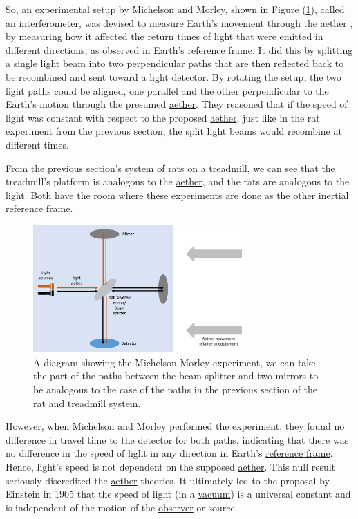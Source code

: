 So, an experimental setup by Michelson and Morley, shown in Figure (\ref{fig: Michelson_morley}), called an interferometer, was devised to measure Earth's movement through the \hyperlink{def-aether}{aether} \cite{EtherExperiment}, by measuring how it affected the return times of light that were emitted in different directions, as observed in Earth's \hyperlink{def-Reference-frame}{reference frame}.
It did this by splitting a single light beam into two perpendicular paths that are then reflected back to be recombined and sent toward a light detector.
By rotating the setup, the two light paths could be aligned, one parallel and the other perpendicular to the Earth's motion through the presumed \hyperlink{def-aether}{aether}.
They reasoned that if the speed of light was constant with respect to the proposed \hyperlink{def-aether}{aether}, just like in the rat experiment from the previous section, the split light beams would recombine at different times.

From the previous section's system of rats on a treadmill, we can see that the treadmill's platform is analogous to the \hyperlink{def-aether}{aether}, and the rats are analogous to the light.
Both have the room where these experiments are done as the other inertial reference frame.

\begin{figure}[H]
	\centering
	\includegraphics[width=8cm]{images/pdf/Michelson_morley.pdf}
	\caption{A diagram showing the Michelson-Morley experiment, we can take the part of the paths between the beam splitter and two mirrors to be analogous to the case of the paths in the previous section of the rat and treadmill system.}
	\label{fig: Michelson_morley}
\end{figure}

However, when Michelson and Morley performed the experiment, they found no difference in travel time to the detector for both paths, indicating that there was no difference in the speed of light in any direction in Earth's \hyperlink{def-Reference-frame}{reference frame}.
Hence, light's speed is not dependent on the supposed \hyperlink{def-aether}{aether}.
This null result seriously discredited the \hyperlink{def-aether}{aether} theories.
It ultimately led to the proposal by Einstein in 1905 that the speed of light (in a \hyperlink{def-vacuum}{vacuum}) is a universal constant and is independent of the motion of the \hyperlink{def-observer}{observer} or source.

